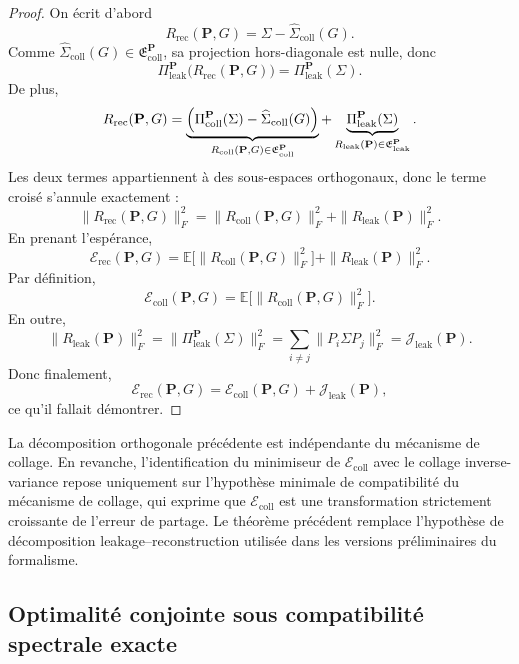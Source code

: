 \begin{proof}
On écrit d'abord
\[
R_{\mathrm{rec}}(\mathbf P,G)
=
\Sigma-\widehat \Sigma_{\mathrm{coll}}(G).
\]
Comme \(\widehat \Sigma_{\mathrm{coll}}(G)\in \mathfrak E_{\mathrm{coll}}^{\mathbf P}\), sa projection hors-diagonale est nulle, donc
\[
\Pi_{\mathrm{leak}}^{\mathbf P}\!\bigl(R_{\mathrm{rec}}(\mathbf P,G)\bigr)
=
\Pi_{\mathrm{leak}}^{\mathbf P}(\Sigma).
\]
De plus,
\[
R_{\mathrm{rec}}(\mathbf P,G)
=
\underbrace{\Bigl(\Pi_{\mathrm{coll}}^{\mathbf P}(\Sigma)-\widehat \Sigma_{\mathrm{coll}}(G)\Bigr)}_{R_{\mathrm{coll}}(\mathbf P,G)\in\mathfrak E_{\mathrm{coll}}^{\mathbf P}}
+
\underbrace{\Pi_{\mathrm{leak}}^{\mathbf P}(\Sigma)}_{R_{\mathrm{leak}}(\mathbf P)\in\mathfrak E_{\mathrm{leak}}^{\mathbf P}}.
\]
Les deux termes appartiennent à des sous-espaces orthogonaux, donc le terme croisé s'annule exactement :
\[
\|R_{\mathrm{rec}}(\mathbf P,G)\|_F^2
=
\|R_{\mathrm{coll}}(\mathbf P,G)\|_F^2
+
\|R_{\mathrm{leak}}(\mathbf P)\|_F^2.
\]
En prenant l'espérance,
\[
\mathcal E_{\mathrm{rec}}(\mathbf P,G)
=
\mathbb E\bigl[\|R_{\mathrm{coll}}(\mathbf P,G)\|_F^2\bigr]
+
\|R_{\mathrm{leak}}(\mathbf P)\|_F^2.
\]
Par définition,
\[
\mathcal E_{\mathrm{coll}}(\mathbf P,G)
=
\mathbb E\bigl[\|R_{\mathrm{coll}}(\mathbf P,G)\|_F^2\bigr].
\]
En outre,
\[
\|R_{\mathrm{leak}}(\mathbf P)\|_F^2
=
\bigl\|\Pi_{\mathrm{leak}}^{\mathbf P}(\Sigma)\bigr\|_F^2
=
\sum_{i\neq j}\|P_i\Sigma P_j\|_F^2
=
\mathcal J_{\mathrm{leak}}(\mathbf P).
\]
Donc finalement,
\[
\mathcal E_{\mathrm{rec}}(\mathbf P,G)
=
\mathcal E_{\mathrm{coll}}(\mathbf P,G)
+
\mathcal J_{\mathrm{leak}}(\mathbf P),
\]
ce qu'il fallait démontrer.
\end{proof}

\begin{remark}
La décomposition orthogonale précédente est indépendante du mécanisme de collage.
En revanche, l'identification du minimiseur de \(\mathcal E_{\mathrm{coll}}\) avec le collage inverse-variance repose uniquement sur l'hypothèse minimale de compatibilité du mécanisme de collage, qui exprime que \(\mathcal E_{\mathrm{coll}}\) est une transformation strictement croissante de l'erreur de partage.
Le théorème précédent remplace l'hypothèse de décomposition leakage--reconstruction utilisée dans les versions préliminaires du formalisme.
\end{remark}

\subsection{Optimalité conjointe sous compatibilité spectrale exacte}

